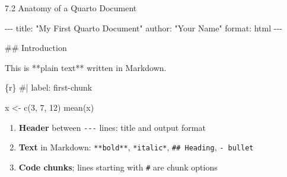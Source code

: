 \documentclass[
  ignorenonframetext,
  aspectratio=169,
]{beamer}
\newenvironment{Shaded}{\begin{snugshade}}{\end{snugshade}}
\newcommand{\AnnotationTok}[1]{\textcolor[rgb]{0.37,0.37,0.37}{#1}}
\newcommand{\CommentTok}[1]{\textcolor[rgb]{0.37,0.37,0.37}{#1}}
\newcommand{\DecValTok}[1]{\textcolor[rgb]{0.68,0.00,0.00}{#1}}
\newcommand{\FunctionTok}[1]{\textcolor[rgb]{0.28,0.35,0.67}{#1}}
\newcommand{\InformationTok}[1]{\textcolor[rgb]{0.37,0.37,0.37}{#1}}
\newcommand{\NormalTok}[1]{\textcolor[rgb]{0.00,0.23,0.31}{#1}}
\newcommand{\OtherTok}[1]{\textcolor[rgb]{0.00,0.23,0.31}{#1}}
\providecommand{\tightlist}{%
  \setlength{\itemsep}{0pt}\setlength{\parskip}{0pt}}
\begin{document}
\begin{frame}[fragile]{7.2 Anatomy of a Quarto Document}
\protect{}\label{anatomy-of-a-quarto-document}
\begin{Shaded}
\begin{Highlighting}[]
\CommentTok{{-}{-}{-}}
\AnnotationTok{title:}\CommentTok{ "My First Quarto Document"}
\AnnotationTok{author:}\CommentTok{ "Your Name"}
\AnnotationTok{format:}\CommentTok{ html}
\CommentTok{{-}{-}{-}}

\FunctionTok{\#\# Introduction}

\NormalTok{This is **plain text** written in Markdown.}

\InformationTok{\textasciigrave{}\textasciigrave{}\textasciigrave{}\{r\}}
\CommentTok{\#| label: first{-}chunk}

\NormalTok{x }\OtherTok{\textless{}{-}} \FunctionTok{c}\NormalTok{(}\DecValTok{3}\NormalTok{, }\DecValTok{7}\NormalTok{, }\DecValTok{12}\NormalTok{)}
\FunctionTok{mean}\NormalTok{(x)}
\InformationTok{\textasciigrave{}\textasciigrave{}\textasciigrave{}}
\end{Highlighting}
\end{Shaded}

\begin{enumerate}
\tightlist
\item
  \textbf{Header} between \texttt{-\/-\/-} lines: title and output
  format
\item
  \textbf{Text} in Markdown: \texttt{**bold**}, \texttt{*italic*},
  \texttt{\#\#\ Heading}, \texttt{-\ bullet}
\item
  \textbf{Code chunks}; lines starting with \texttt{\#\textbar{}} are
  chunk options
\end{enumerate}
\end{frame}
\end{document}

